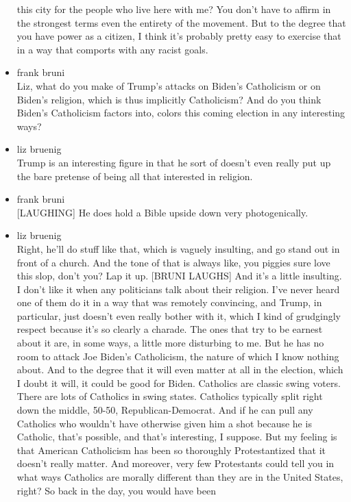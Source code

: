 \begin{itemize}
  this city for the people who live here with me? You don't have to
  affirm in the strongest terms even the entirety of the movement. But
  to the degree that you have power as a citizen, I think it's probably
  pretty easy to exercise that in a way that comports with any racist
  goals.
\item
  frank bruni\\
  Liz, what do you make of Trump's attacks on Biden's Catholicism or on
  Biden's religion, which is thus implicitly Catholicism? And do you
  think Biden's Catholicism factors into, colors this coming election in
  any interesting ways?
\item
  liz bruenig\\
  Trump is an interesting figure in that he sort of doesn't even really
  put up the bare pretense of being all that interested in religion.
\item
  frank bruni\\
  {[}LAUGHING{]} He does hold a Bible upside down very photogenically.
\item
  liz bruenig\\
  Right, he'll do stuff like that, which is vaguely insulting, and go
  stand out in front of a church. And the tone of that is always like,
  you piggies sure love this slop, don't you? Lap it up. {[}BRUNI
  LAUGHS{]} And it's a little insulting. I don't like it when any
  politicians talk about their religion. I've never heard one of them do
  it in a way that was remotely convincing, and Trump, in particular,
  just doesn't even really bother with it, which I kind of grudgingly
  respect because it's so clearly a charade. The ones that try to be
  earnest about it are, in some ways, a little more disturbing to me.
  But he has no room to attack Joe Biden's Catholicism, the nature of
  which I know nothing about. And to the degree that it will even matter
  at all in the election, which I doubt it will, it could be good for
  Biden. Catholics are classic swing voters. There are lots of Catholics
  in swing states. Catholics typically split right down the middle,
  50-50, Republican-Democrat. And if he can pull any Catholics who
  wouldn't have otherwise given him a shot because he is Catholic,
  that's possible, and that's interesting, I suppose. But my feeling is
  that American Catholicism has been so thoroughly Protestantized that
  it doesn't really matter. And moreover, very few Protestants could
  tell you in what ways Catholics are morally different than they are in
  the United States, right? So back in the day, you would have been

\end{itemize}
